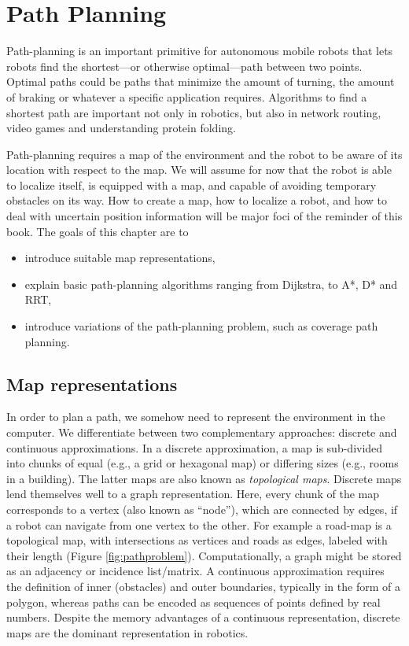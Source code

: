 \chapter{Path Planning}\label{chap:pathplanning}
Path-planning is an important primitive for autonomous mobile robots that lets robots find the shortest---or otherwise optimal---path between two points. Optimal paths could be paths that minimize the amount of turning, the amount of braking or whatever a specific application requires. Algorithms to find a shortest path are important not only in robotics, but also in network routing, video games and understanding protein folding.

Path-planning requires a map of the environment and the robot to be aware of its location with respect to the map. We will assume for now that the robot is able to localize itself,  is equipped with a map, and capable of avoiding temporary obstacles on its way. How to create a map, how to localize a robot, and how to deal with uncertain position information will be major foci of the reminder of this  book. The goals of this chapter are to

\begin{itemize}
\item introduce suitable map representations,
\item explain basic path-planning algorithms  ranging from Dijkstra, to A*, D* and RRT,
\item introduce variations of the path-planning problem, such as coverage path planning.
\end{itemize}

\section{Map representations}\label{sec:maps}
In order to plan a path, we somehow need to represent the environment in the computer. We differentiate between two complementary approaches: discrete and continuous approximations. In a discrete approximation, a map is sub-divided into chunks of equal (e.g., a grid or hexagonal map) or differing sizes (e.g., rooms in a building). The latter maps are also known as \emph{topological maps}. Discrete maps lend themselves well to a graph representation. Here, every chunk of the map corresponds to a vertex (also known as ``node''), which are connected by edges, if a robot can navigate from one vertex to the other. For example a road-map is a topological map, with intersections as vertices and roads as edges, labeled with their length (Figure \ref{fig:pathproblem}). Computationally, a graph might be stored as an adjacency or incidence list/matrix. A continuous approximation requires the definition of inner (obstacles) and outer boundaries, typically in the form of a polygon, whereas paths can be encoded as sequences of points defined by real numbers. Despite the memory advantages of a continuous representation, discrete maps are the dominant representation in robotics.

